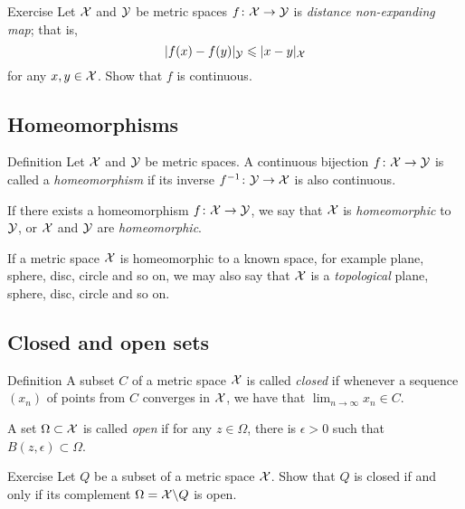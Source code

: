 \begin{thm}{Exercise}\label{ex:shrt=>continuous}
Let ${\mathcal{X}}$ and $\mathcal{Y}$ be metric spaces $f\colon\mathcal{X}\to \mathcal{Y}$ is {}\emph{distance non-expanding map}; that is, 
\[\dist{f(x)}{f(y)}{\spc{Y}}\le \dist{x}{y}{\spc{X}}\]
for any $x,y\in \mathcal{X}$.
Show that $f$ is continuous.
\end{thm}

\subsection*{Homeomorphisms}

\begin{thm}{Definition}
Let $\mathcal{X}$ and $\mathcal{Y}$ be metric spaces.
A continuous bijection $f\colon\mathcal{X}\to \mathcal{Y}$ 
is called a \emph{homeomorphism} 
if its inverse $f^{-1}\:\spc{Y}\z\to \spc{X}$ is also continuous.

If there exists a homeomorphism $f\colon\mathcal{X}\to \mathcal{Y}$,
we say that ${\mathcal{X}}$ is {}\emph{homeomorphic} to $\mathcal{Y}$,
or  $\mathcal{X}$ and $\mathcal{Y}$ are {}\emph{homeomorphic}.
\end{thm}

If a metric space $\mathcal{X}$ is homeomorphic to a known space, for example plane, sphere, disc, circle and so on,
we may also say that $\mathcal{X}$ is a \emph{topological} plane, sphere, disc, circle and so on.

\subsection*{Closed and open sets}

\begin{thm}{Definition}
A subset $C$ of a metric space $\mathcal{X}$ is called \emph{closed} if whenever a sequence $(x_n)$ of points from $C$ converges in $\mathcal{X}$, we have that $\lim_{n\to\infty} x_n \in C$.

A set $\Omega \subset \mathcal{X}$ is called \emph{open} if for any $z\in \Omega$, 
there is $\epsilon>0$ such that $B(z,\epsilon)\subset\Omega$.
\end{thm}

\begin{thm}{Exercise}\label{ex:close-open}
Let $Q$ be a subset of a metric space $\mathcal{X}$.
Show that $Q$ is closed if and only if its complement $\Omega=\mathcal{X}\backslash Q$ is open.
\end{thm}


